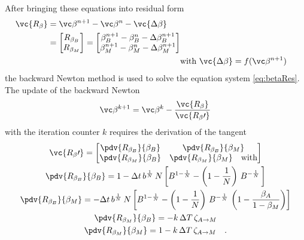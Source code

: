 After bringing these equations into residual form 
\begin{align}
	\begin{split}
		\vc {R_{\beta}} &= \vc \beta^{n+1} - \vc \beta^n- \vc {\Delta \beta} \\
		&= \begin{bmatrix}
			R_{\beta_B}\\ 
			R_{\beta_M}
		\end{bmatrix} 		
		= \begin{bmatrix}
			\beta_B^{n+1} - \beta_B^{n} - \Delta \beta_B^{n+1} \\ 
			\beta_M^{n+1} - \beta_M^{n} - \Delta \beta_M^{n+1}
		\end{bmatrix}
	\end{split} \label{eq:betaRes}
	\\
	&\text{with  } \vc {\Delta \beta} = f(\vc \beta^{n+1})
\end{align}
the backward Newton method is used to solve the equation system \ref{eq:betaRes}. The update of the backward Newton 
\begin{equation}
	\vc \beta^{k+1} = \vc \beta^k - \frac{\vc {R_\beta}}{\vc {R_\beta \prime}}
	\label{eq:NewtonUpdate}
\end{equation}
with the iteration counter $k$ requires the derivation of the tangent 
\begin{gather}
	\vc {R_\beta \prime} = 
	\begin{bmatrix}
		\pdv{R_{\beta_B}}{\beta_B}&\pdv{R_{\beta_B}}{\beta_M}\\
		\pdv{R_{\beta_M}}{\beta_B}&\pdv{R_{\beta_M}}{\beta_M}\quad \text{with}\\ 
	\end{bmatrix}\\
	\pdv{R_{\beta_B}}{\beta_B} = 1 - \Delta t \,b^{\frac{1}{N}}\, N \left[B^{1-\frac{1}{N}} 
		- \left(1- \frac{1}{N}\right)\,B^{-\frac{1}{N}}\, \right] \\
	\pdv{R_{\beta_B}}{\beta_M} = 
		- \Delta t \,b^{\frac{1}{N}}\, N 
		\left[B^{1-\frac{1}{N}} 
		- \left(1- \frac{1}{N}\right)\,B^{-\frac{1}{N}}\,\left(1- \frac{\beta_A}{1-\beta_M}\right)
		\right]\\
	\pdv{R_{\beta_M}}{\beta_B} = -k\,\Delta T \, \zeta_{A \rightarrow M}\\
	\pdv{R_{\beta_M}}{\beta_M} = 1 - k\,\Delta T \,\zeta_{A \rightarrow M} \quad.
\end{gather}



